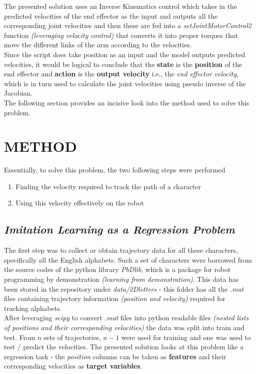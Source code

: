 \documentclass[a4paper]{article}
\begin{document}
The presented solution uses an Inverse Kinematics control which takes in the predicted velocities of the end effector as the input and outputs all the corresponding joint velocities and then these are fed into a {\it setJointMotorControl2} function {\it (leveraging velocity control)} that converts it into proper torques that move the different links of the arm according to the velocities. \\

Since the script does take position as an input and the model outputs predicted velocities, it would be logical to conclude that the \textbf{state} is the \textbf{position} of the end effector and \textbf{action} is the \textbf{output velocity} i.e., the {\it end effector velocity}, which is in turn used to calculate the joint velocities using pseudo inverse of the Jacobian.\\

The following section provides an incisive look into the method used to solve this problem.
\bigskip


\section{METHOD}
Essentially, to solve this problem, the two following steps were performed
\begin{enumerate}
    \item Finding the velocity required to track the path of a character
    \item Using this velocity effectively on the robot
\end{enumerate}

\subsection{\it \textbf{Imitation Learning as a Regression Problem}}
The first step was to collect or obtain trajectory data for all these characters, specifically all the English alphabets. Such a set of characters were borrowed from the source codes of the python library {\it PbDlib}, which is a package for robot programming by demonstration {\it (learning from demonstration)}. This data has been stored in the repository under {\it data/2Dletters} - this folder has all the {\it .mat} files containing trajectory information {\it (position and velocity)} required for tracking alphabets.\\

After leveraging {\it scipy} to convert {\it .mat} files into python readable files {\it (nested lists of positions and their corresponding velocities)} the data was split into train and test. From $n$ sets of trajectories, $n - 1$ were used for training and one was used to test / predict the velocities. The presented solution looks at this problem like a regression task - the {\it position} columns can be taken as \textbf{features} and their corresponding velocities as \textbf{target variables}.\\
\end{document}
